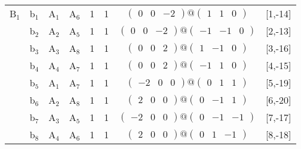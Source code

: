 \documentclass[fleqn,10pt,landscape]{article}
\begin{document}
\begin{itemize}
\begin{center}
\begin{longtable}{cc|cc|c|c|c|l}
B$_{1}$ & b$_{1}$ & A$_{1}$ & A$_{6}$ & 1 & 1 & $\begin{pmatrix} 0 & 0 & -2 \end{pmatrix}@\begin{pmatrix} 1 & 1 & 0 \end{pmatrix}$ & [1,-14] \\
& b$_{2}$ & A$_{2}$ & A$_{5}$ & 1 & 1 & $\begin{pmatrix} 0 & 0 & -2 \end{pmatrix}@\begin{pmatrix} -1 & -1 & 0 \end{pmatrix}$ & [2,-13] \\
& b$_{3}$ & A$_{3}$ & A$_{8}$ & 1 & 1 & $\begin{pmatrix} 0 & 0 & 2 \end{pmatrix}@\begin{pmatrix} 1 & -1 & 0 \end{pmatrix}$ & [3,-16] \\
& b$_{4}$ & A$_{4}$ & A$_{7}$ & 1 & 1 & $\begin{pmatrix} 0 & 0 & 2 \end{pmatrix}@\begin{pmatrix} -1 & 1 & 0 \end{pmatrix}$ & [4,-15] \\
& b$_{5}$ & A$_{1}$ & A$_{7}$ & 1 & 1 & $\begin{pmatrix} -2 & 0 & 0 \end{pmatrix}@\begin{pmatrix} 0 & 1 & 1 \end{pmatrix}$ & [5,-19] \\
& b$_{6}$ & A$_{2}$ & A$_{8}$ & 1 & 1 & $\begin{pmatrix} 2 & 0 & 0 \end{pmatrix}@\begin{pmatrix} 0 & -1 & 1 \end{pmatrix}$ & [6,-20] \\
& b$_{7}$ & A$_{3}$ & A$_{5}$ & 1 & 1 & $\begin{pmatrix} -2 & 0 & 0 \end{pmatrix}@\begin{pmatrix} 0 & -1 & -1 \end{pmatrix}$ & [7,-17] \\
& b$_{8}$ & A$_{4}$ & A$_{6}$ & 1 & 1 & $\begin{pmatrix} 2 & 0 & 0 \end{pmatrix}@\begin{pmatrix} 0 & 1 & -1 \end{pmatrix}$ & [8,-18] \\

\end{longtable}
\end{center}
\end{itemize}
\end{document}
